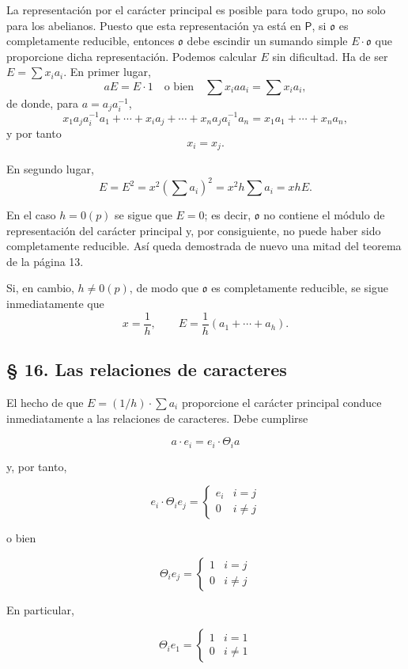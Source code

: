 La representación por el carácter principal es posible para todo grupo, no solo para los abelianos. Puesto que esta representación ya está en \(\mathsf P\), si \(\mathfrak o\) es completamente reducible, entonces \(\mathfrak o\) debe escindir un sumando simple \(E\cdot\mathfrak o\) que proporcione dicha representación. Podemos calcular \(E\) sin dificultad. Ha de ser \(E=\sum x_i a_i\). En primer lugar,
\[
aE=E\cdot 1\quad\text{o bien}\quad \sum x_i a a_i=\sum x_i a_i,
\]
de donde, para \(a=a_j a_i^{-1}\),
\[
x_1a_ja_i^{-1}a_1+\cdots+x_i a_j+\cdots+x_na_ja_i^{-1}a_n
=x_1a_1+\cdots+x_na_n,
\]
y por tanto
\[
x_i=x_j.
\]

En segundo lugar,
\[
E=E^2=x^2\left(\sum a_i\right)^2=x^2h\sum a_i=xhE.
\]

En el caso \(h=0(p)\) se sigue que \(E=0\); es decir, \(\mathfrak o\) no contiene el módulo de representación del carácter principal y, por consiguiente, no puede haber sido completamente reducible. Así queda demostrada de nuevo una mitad del teorema de la página 13.

Si, en cambio, \(h\ne0(p)\), de modo que \(\mathfrak o\) es completamente reducible, se sigue inmediatamente que
\[
x=\frac{1}{h},\qquad E=\frac{1}{h}(a_1+\cdots+a_h).
\]

\subsection*{§ 16. Las relaciones de caracteres}\label{las-relaciones-de-caracteres}

El hecho de que \(E=(1/h)\cdot\sum a_i\) proporcione el carácter principal conduce inmediatamente a las relaciones de caracteres. Debe cumplirse

\[a \cdot e_i = e_i \cdot \Theta_i a\]

y, por tanto,

\[e_i \cdot \Theta_i e_j = \begin{cases} e_i & i = j \\ 0 & i \neq j \end{cases}\]

o bien

\[\Theta_i e_j = \begin{cases} 1 & i = j \\ 0 & i \neq j \end{cases}\]

En particular,

\[\Theta_i e_1 = \begin{cases} 1 & i = 1 \\ 0 & i \neq 1 \end{cases}\]

